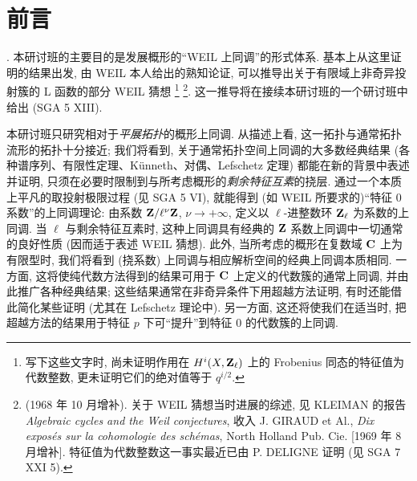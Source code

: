 \chapter*{前言}

\begingroup
\renewcommand{\thefootnote}{\fnsymbol{footnote}}
. 本研讨班的主要目的是发展概形的“WEIL 上同调”的形式体系.
基本上从这里证明的结果出发, 由 WEIL 本人给出的熟知论证,
可以推导出关于有限域上非奇异投射簇的 L 函数的部分 WEIL 猜想
\footnote[1]{写下这些文字时, 尚未证明作用在 $H^i(X,\mathbf{Z}_\ell)$ 上的 Frobenius 同态的特征值为代数整数,
更未证明它们的绝对值等于 $q^{i/2}$.}
\footnote[2]{(1968 年 10 月增补).
关于 WEIL 猜想当时进展的综述, 见 KLEIMAN 的报告
\textit{Algebraic cycles and the Weil conjectures},
收入 J. GIRAUD et Al., \textit{Dix exposés sur la cohomologie des schémas}, North Holland Pub. Cie.
[1969 年 8 月增补]. 特征值为代数整数这一事实最近已由 P. DELIGNE 证明
(见 SGA 7 XXI 5).}.
这一推导将在接续本研讨班的一个研讨班中给出 (SGA 5 XIII).
\par\endgroup

本研讨班只研究相对于\emph{平展拓扑}的概形上同调.
从描述上看, 这一拓扑与通常拓扑流形的拓扑十分接近;
我们将看到, 关于通常拓扑空间上同调的大多数经典结果
(各种谱序列、有限性定理、Künneth、对偶、Lefschetz 定理)
都能在新的背景中表述并证明,
只须在必要时限制到与所考虑概形的\emph{剩余特征互素}的挠层.
通过一个本质上平凡的取投射极限过程 (见 SGA 5 VI),
就能得到 (如 WEIL 所要求的)“特征 0 系数”的上同调理论:
由系数 $\mathbf{Z}/\ell^\nu\mathbf{Z}$, $\nu\longrightarrow+\infty$,
定义以 $\ell$-进整数环 $\mathbf{Z}_\ell$ 为系数的上同调.
当 $\ell$ 与剩余特征互素时,
这种上同调具有经典的 $\mathbf{Z}$ 系数上同调中一切通常的良好性质
(因而适于表述 WEIL 猜想).
此外, 当所考虑的概形在复数域 $\mathbf{C}$ 上为有限型时,
我们将看到 (挠系数) 上同调与相应解析空间的经典上同调本质相同.
一方面, 这将使纯代数方法得到的结果可用于 $\mathbf{C}$ 上定义的代数簇的通常上同调,
并由此推广各种经典结果;
这些结果通常在非奇异条件下用超越方法证明,
有时还能借此简化某些证明 (尤其在 Lefschetz 理论中).
另一方面, 这还将使我们在适当时,
把超越方法的结果用于特征 $p$ 下可“提升”到特征 0 的代数簇的上同调.

